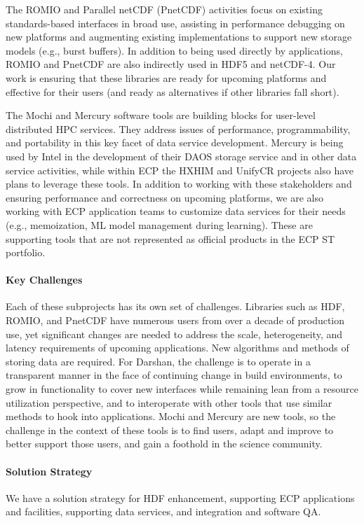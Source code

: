 The ROMIO and Parallel netCDF (PnetCDF) activities
focus on existing standards-based interfaces in broad use, assisting
in performance debugging on new platforms and augmenting existing
implementations to support new storage models (e.g., burst
buffers). In addition to being used directly by applications, ROMIO
and PnetCDF are also indirectly used in HDF5 and netCDF-4. Our work is
ensuring that these libraries are ready for upcoming platforms and
effective for their users (and ready as alternatives if other
libraries fall short).

The Mochi and Mercury software tools are building blocks for
user-level distributed HPC services. They address issues of
performance, programmability, and portability in this key facet of
data service development. Mercury is being used by Intel in the
development of their DAOS storage service and in other data service
activities, while within ECP the HXHIM and UnifyCR projects also have
plans to leverage these tools. In addition to working with these
stakeholders and ensuring performance and correctness on upcoming
platforms, we are also working with ECP application teams to customize
data services for their needs (e.g., memoization, ML model management
during learning). These are supporting tools that are not represented as 
official products in the ECP ST portfolio.

\paragraph{Key Challenges}

Each of these subprojects has its own set of challenges. Libraries
such as HDF, ROMIO, and PnetCDF have numerous users from over a decade of
production use, yet significant changes are needed to address the
scale, heterogeneity, and latency requirements of upcoming
applications. New algorithms and methods of storing data are required.
%
For Darshan, the challenge is to operate in a transparent manner in
the face of continuing change in build environments, to grow in
functionality to cover new interfaces while remaining lean from a
resource utilization perspective, and to interoperate with other tools
that use similar methods to hook into applications.
%
Mochi and Mercury are new tools, so the challenge in the context of
these tools is to find users, adapt and improve to better support
those users, and gain a foothold in the science community.

\paragraph{Solution Strategy} We have a solution strategy for HDF enhancement, supporting ECP applications and facilities, supporting data services, and integration and software QA.

